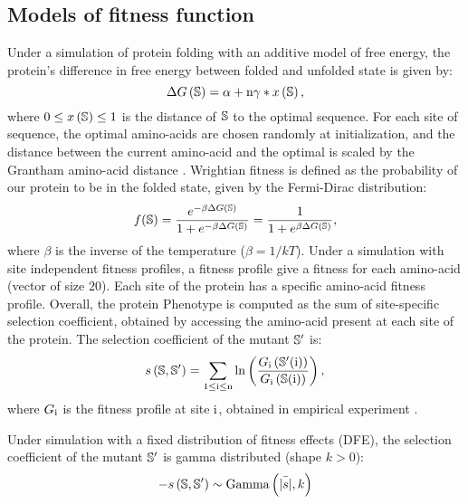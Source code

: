 \subsection{Models of fitness function}
\label{MatMet:folding}

Under a simulation of protein folding with an additive model of free energy, the protein's difference in free energy between folded and unfolded state is given by:
\begin{equation*}
\Delta G\left(\mathbb{S}\right) = \alpha + \text{n} \gamma * x\left(\mathbb{S}\right), 
\end{equation*}
where $0 \leq x\left(\mathbb{S}\right) \leq 1$ is the distance of $\mathbb{S}$ to the optimal sequence.
For each site of sequence, the optimal amino-acids are chosen randomly at initialization, and the distance between the current amino-acid and the optimal is scaled by the Grantham amino-acid distance \citep{Grantham1974}.
Wrightian fitness is defined as the probability of our protein to be in the folded state, given by the Fermi-Dirac distribution: 
\begin{equation}
f(\mathbb{S}) = \dfrac{e^{-\beta \Delta G\left(\mathbb{S}\right) }}{1 + e^{-\beta \Delta G\left(\mathbb{S}\right) }} = \dfrac{1}{1 + e^{\beta \Delta G\left(\mathbb{S}\right) }}, 
\end{equation}
where $\beta$ is the inverse of the temperature ($\beta=1/kT$).
Under a simulation with site independent fitness profiles, a fitness profile give a fitness for each amino-acid (vector of size $20$).
Each site of the protein has a specific amino-acid fitness profile.
Overall, the protein \gls{Phenotype} is computed as the sum of site-specific selection coefficient, obtained by accessing the amino-acid present at each site of the protein.
The selection coefficient of the mutant $\mathbb{S}'$ is:
\begin{equation}
s \left( \mathbb{S},\mathbb{S}'\right) = \sum_{1 \leq \text{i} \leq \text{n}} \ln \left( \dfrac{G_{\text{i}} \left(\mathbb{S}'(\text{i}) \right)}{G_{\text{i}} \left(\mathbb{S}(\text{i}) \right)} \right) ,
\end{equation}
where $G_{\text{i}}$ is the fitness profile at site $\text{i}$, obtained in empirical experiment \citep{Bloom2017}.

Under simulation with a fixed distribution of fitness effects (\acrshort{DFE}), the selection coefficient of the mutant $\mathbb{S}'$ is gamma distributed (shape $k > 0$):
\begin{equation}
- s \left( \mathbb{S},\mathbb{S}'\right) \sim \text{Gamma} \left( \bar{|s|}, k \right)
\end{equation}
